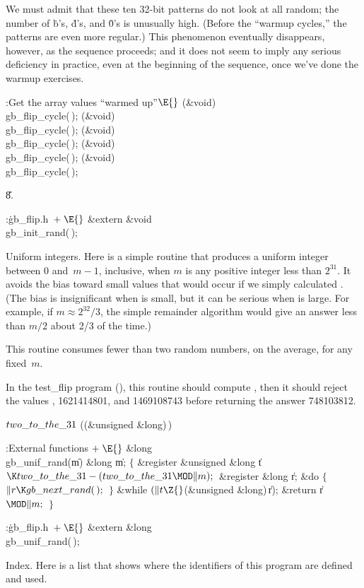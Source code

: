 We must admit that these ten 32-bit patterns do not look at all
random; the number of \.b's, \.d's, and \.0's is unusually high. (Before
the ``warmup cycles,'' the patterns are even more regular.) This
phenomenon eventually disappears, however, as the sequence proceeds;
and it does not seem to imply any serious deficiency in practice, even
at the beginning of the sequence, once we've done the warmup exercises.

\Y\B\4:Get the array values ``warmed up''\X${}\E{}$\6
(\&{void})\,\\{gb\_flip\_cycle}(\,);\6
(\&{void})\,\\{gb\_flip\_cycle}(\,);\6
(\&{void})\,\\{gb\_flip\_cycle}(\,);\6
(\&{void})\,\\{gb\_flip\_cycle}(\,);\6
(\&{void})\,\\{gb\_flip\_cycle}(\,);\par
\U8.\fi

\B{}:\.{gb\_flip.h\,}\X${}\mathrel+\E{}$\6
\&{extern} \&{void} \\{gb\_init\_rand}(\,);\par
\fi

Uniform integers.
Here is a simple routine that produces a uniform integer between
0 and~$m-1$, inclusive, when $m$ is any positive integer less than $2^{31}$.
It avoids the bias toward small values that would occur if we simply
calculated . (The bias is insignificant
when  is
small, but it can be serious when  is large. For example, if
$m\approx 2^{32}\!/3$, the simple remainder algorithm would give an answer
less than $m/2$ about 2/3 of the time.)

This routine consumes fewer than two random numbers, on the average,
for any fixed~$m$.

In the \.{test\_flip} program (), this routine should compute %
,
then it should reject the values , 1621414801, and
1469108743 before returning the answer 748103812.

\Y\B\4\D$\\{two\_to\_the\_31}$ \5
((\&{unsigned} \&{long})\,)\par
\Y\B\4:External functions\X${}\mathrel+\E{}$\6
\1\1\&{long} \\{gb\_unif\_rand}(\|m)\6
\&{long} \|m;\2\2\6
${}\{{}$\5
\1\&{register} \&{unsigned} \&{long} \|t${}\K\\{two\_to\_the\_31}-(\\{two\_to%
\_the\_31}\MOD\|m);{}$\6
\&{register} \&{long} \|r;\7
\&{do}\5
${}\{{}$\1\6
${}\|r\K\\{gb\_next\_rand}(\,);{}$\6
\4${}\}{}$\5
\2\5
\&{while} ${}(\|t\Z{}$(\&{unsigned} \&{long})\,\|r);\6
\&{return} \|r${}\MOD\|m;{}$\6
\4${}\}{}$\2\par
\fi

\B{}:\.{gb\_flip.h\,}\X${}\mathrel+\E{}$\6
\&{extern} \&{long} \\{gb\_unif\_rand}(\,);\par
\fi

Index. Here is a list that shows where the identifiers of this program
are
defined and used.
\fi

\inx
\fin
\con
